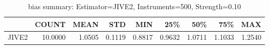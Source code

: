 \begin{table}[ht]
\centering
\caption{bias summary: Estimator=JIVE2, Instruments=500, Strength=0.10}
\begin{tabular}{lrrrrrrrr}
\toprule
 & COUNT & MEAN & STD & MIN & 25\% & 50\% & 75\% & MAX \\
\midrule
JIVE2 & 10.0000 & 1.0505 & 0.1119 & 0.8817 & 0.9632 & 1.0711 & 1.1033 & 1.2540 \\
\bottomrule
\end{tabular}
\end{table}
